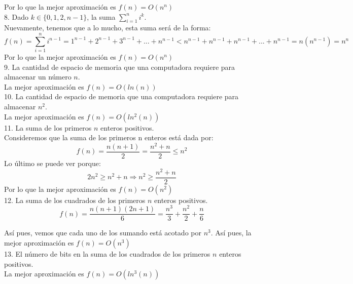 \documentclass[12pt]{article}
\begin{document}
Por lo que la mejor aproximaci\'on es $f(n)=O(n^n)$\\

8. Dado $k\in\{0,1,2,n-1\}$, la suma $\sum_{i=1}^{n}{i^k}$.\\
Nuevamente, tenemos que a lo mucho, esta suma ser\'a de la forma:
$$f(n)=\sum_{i=1}^{n}{i^{n-1}}=1^{n-1}+2^{n-1}+3^{n-1}+...+n^{n-1}<n^{n-1}+n^{n-1}+n^{n-1}+...+n^{n-1}=n(n^{n-1})=n^n$$
Por lo que la mejor aproximaci\'on es $f(n)=O(n^n)$\\

9. La cantidad de espacio de memoria que una computadora requiere para almacenar un n\'umero $n$.\\
La mejor aproximaci\'on es $f(n)=O(ln(n))$\\


10. La cantidad de espacio de memoria que una computadora requiere para almacenar $n^2$.\\
La mejor aproximaci\'on es $f(n)=O(ln^2(n))$\\

11. La suma de los primeros $n$ enteros positivos.\\
Consideremos que la suma de los primeros n enteros está dada por:
$$f(n)=\frac{n(n+1)}{2}=\frac{n^2+n}{2}\leq n^2$$
Lo \'ultimo se puede ver porque:
$$2n^2\geq n^2+n\Longrightarrow n^2\geq \frac{n^2+n}{2}$$
Por lo que la mejor aproximaci\'on es $f(n)=O(n^2)$\\

12. La suma de los cuadrados de los primeros $n$ enteros positivos.\\
$$f(n)=\frac{n(n+1)(2n+1)}{6}=\frac{n^3}{3}+\frac{n^2}{2}+\frac{n}{6}$$

Así pues, vemos que cada uno de los sumando est\'a acotado por $n^3$. Así pues, la mejor aproximaci\'on es $f(n)=O(n^3)$\\

13. El n\'umero de bits en la suma de los cuadrados de los primeros $n$ enteros positivos.\\
La mejor aproximaci\'on es $f(n)=O(ln^3(n))$\\
\end{document}
